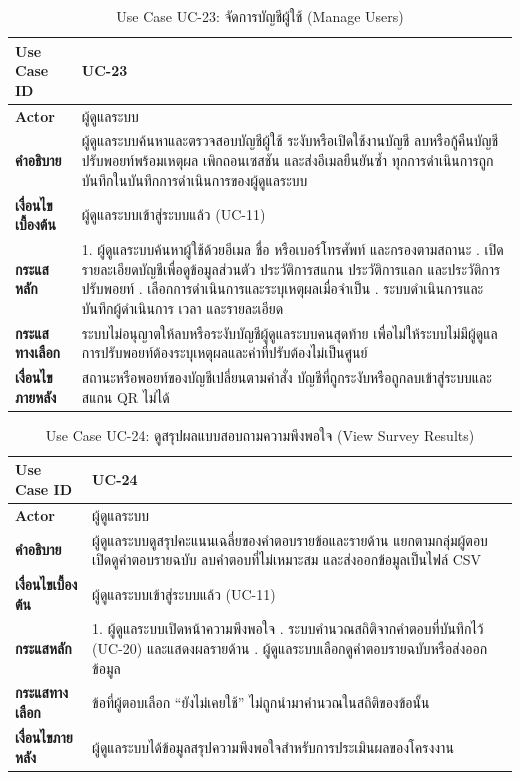 \begin{table}[H]
\centering
\caption{Use Case UC-23: จัดการบัญชีผู้ใช้ (Manage Users)}
\label{tab:uc23}
\begin{tabular}{|p{3.2cm}|p{10cm}|}
\hline
\textbf{Use Case ID} & UC-23 \\ \hline
\textbf{Actor} & ผู้ดูแลระบบ \\ \hline
\textbf{คำอธิบาย} & ผู้ดูแลระบบค้นหาและตรวจสอบบัญชีผู้ใช้ ระงับหรือเปิดใช้งานบัญชี ลบหรือกู้คืนบัญชี ปรับพอยท์พร้อมเหตุผล เพิกถอนเซสชัน และส่งอีเมลยืนยันซ้ำ ทุกการดำเนินการถูกบันทึกในบันทึกการดำเนินการของผู้ดูแลระบบ \\ \hline
\textbf{เงื่อนไขเบื้องต้น} & ผู้ดูแลระบบเข้าสู่ระบบแล้ว (UC-11) \\ \hline
\textbf{กระแสหลัก} & 1. ผู้ดูแลระบบค้นหาผู้ใช้ด้วยอีเมล ชื่อ หรือเบอร์โทรศัพท์ และกรองตามสถานะ \newline 2. เปิดรายละเอียดบัญชีเพื่อดูข้อมูลส่วนตัว ประวัติการสแกน ประวัติการแลก และประวัติการปรับพอยท์ \newline 3. เลือกการดำเนินการและระบุเหตุผลเมื่อจำเป็น \newline 4. ระบบดำเนินการและบันทึกผู้ดำเนินการ เวลา และรายละเอียด \\ \hline
\textbf{กระแสทางเลือก} & ระบบไม่อนุญาตให้ลบหรือระงับบัญชีผู้ดูแลระบบคนสุดท้าย เพื่อไม่ให้ระบบไม่มีผู้ดูแล \newline การปรับพอยท์ต้องระบุเหตุผลและค่าที่ปรับต้องไม่เป็นศูนย์ \\ \hline
\textbf{เงื่อนไขภายหลัง} & สถานะหรือพอยท์ของบัญชีเปลี่ยนตามคำสั่ง บัญชีที่ถูกระงับหรือถูกลบเข้าสู่ระบบและสแกน QR ไม่ได้ \\
\hline
\end{tabular}
\end{table}

\begin{table}[H]
\centering
\caption{Use Case UC-24: ดูสรุปผลแบบสอบถามความพึงพอใจ (View Survey Results)}
\label{tab:uc24}
\begin{tabular}{|p{3.2cm}|p{10cm}|}
\hline
\textbf{Use Case ID} & UC-24 \\ \hline
\textbf{Actor} & ผู้ดูแลระบบ \\ \hline
\textbf{คำอธิบาย} & ผู้ดูแลระบบดูสรุปคะแนนเฉลี่ยของคำตอบรายข้อและรายด้าน แยกตามกลุ่มผู้ตอบ เปิดดูคำตอบรายฉบับ ลบคำตอบที่ไม่เหมาะสม และส่งออกข้อมูลเป็นไฟล์ CSV \\ \hline
\textbf{เงื่อนไขเบื้องต้น} & ผู้ดูแลระบบเข้าสู่ระบบแล้ว (UC-11) \\ \hline
\textbf{กระแสหลัก} & 1. ผู้ดูแลระบบเปิดหน้าความพึงพอใจ \newline 2. ระบบคำนวณสถิติจากคำตอบที่บันทึกไว้ (UC-20) และแสดงผลรายด้าน \newline 3. ผู้ดูแลระบบเลือกดูคำตอบรายฉบับหรือส่งออกข้อมูล \\ \hline
\textbf{กระแสทางเลือก} & ข้อที่ผู้ตอบเลือก ``ยังไม่เคยใช้'' ไม่ถูกนำมาคำนวณในสถิติของข้อนั้น \\ \hline
\textbf{เงื่อนไขภายหลัง} & ผู้ดูแลระบบได้ข้อมูลสรุปความพึงพอใจสำหรับการประเมินผลของโครงงาน \\
\hline
\end{tabular}
\end{table}

